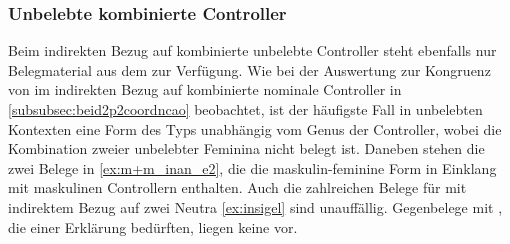 \subsubsection{Unbelebte kombinierte Controller}

Beim indirekten Bezug auf kombinierte unbelebte Controller steht ebenfalls nur
Belegmaterial aus dem  zur Verfügung. Wie bei der Auswertung zur
Kongruenz von  im indirekten Bezug auf kombinierte nominale
Controller in \cref{subsubsec:beid2p2coordncao} beobachtet, ist der häufigste
Fall in unbelebten Kontexten eine Form des Typs  unabhängig vom
Genus der Controller, wobei die Kombination zweier unbelebter Feminina nicht
belegt ist. Daneben stehen die zwei Belege in \cref{ex:m+m_inan_e2}, die die
maskulin-feminine Form  in Einklang mit maskulinen Controllern
enthalten. Auch die zahlreichen Belege für  mit indirektem Bezug
auf zwei Neutra \cref{ex:insigel} sind unauffällig. Gegenbelege mit
, die einer Erklärung bedürften, liegen keine vor.

